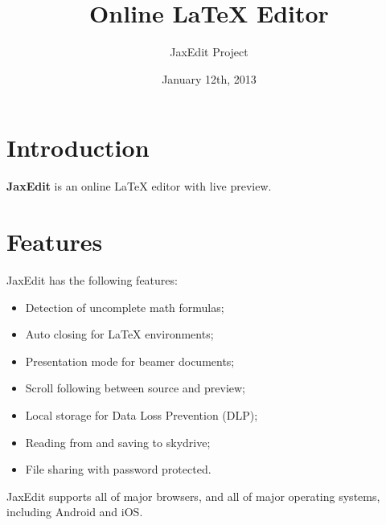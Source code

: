 \documentclass{article}
\begin{document}
\title{Online LaTeX Editor}
\author{JaxEdit Project}
\date{January 12th, 2013}
\maketitle

\tableofcontents

\section{Introduction}

\textbf{JaxEdit} is an online LaTeX editor with live preview.

\section{Features}

JaxEdit has the following features:

\begin{itemize}
\item Detection of uncomplete math formulas;
\item Auto closing for LaTeX environments;
\item Presentation mode for beamer documents;
\item Scroll following between source and preview;
\item Local storage for Data Loss Prevention (DLP);
\item Reading from and saving to skydrive;
\item File sharing with password protected.
\end{itemize}

JaxEdit supports all of major browsers, and all of major operating systems, including Android and iOS.
\end{document}
